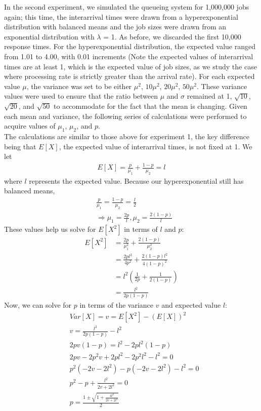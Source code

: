 \documentclass[12pt]{article}
\begin{document}
In the second experiment, we simulated the queueing system for 1,000,000 jobs again; this time, the interarrival times were drawn from a hyperexponential distribution with balanced means and the job sizes were drawn from an exponential distribution with $\lambda$ = 1. As before, we discarded the first 10,000 response times. For the hyperexponential distribution, the expected value ranged from 1.01 to 4.00, with 0.01 increments (Note the expected values of interarrival times are at least 1, which is the expected value of job sizes, as we study the case where processing rate is strictly greater than the arrival rate). For each expected value $\mu$, the variance was set to be either $\mu^2$, $10\mu^2$, $20\mu^2$, $50\mu^2$. These variance values were used to ensure that the ratio between $\mu$ and $\sigma$ remained at 1, $\sqrt{10}$, $\sqrt{20}$, and $\sqrt{50}$ to accommodate for the fact that the mean is changing. Given each mean and variance, the following series of calculations were performed to acquire values of $\mu_1$, $\mu_2$, and $p$. \\

The calculations are similar to those above for experiment 1, the key difference being that $E[X]$, the expected value of interarrival times, is not fixed at 1. We let
\begin{align*}
E[X] = \frac{p}{\mu_1} + \frac{1-p}{\mu_2} = l
\end{align*}
where $l$ represents the expected value. Because our hyperexponential still has balanced means, 
\begin{align*}
&\frac{p}{\mu_1} = \frac{1-p}{\mu_2} = \frac{l}{2} \\
&\Rightarrow \mu_1 = \frac{2p}{l}, \mu_2 = \frac{2(1-p)}{l}
\end{align*}
These values help us solve for $E[X^2]$ in terms of $l$ and $p$: 
\begin{align*}
E[X^2] &= \frac{2p}{\mu_1^2} + \frac{2(1-p)}{\mu_2^2} \\
&= \frac{2pl^2}{4p^2} + \frac{2(1-p)l^2}{4(1-p)^2} \\ 
&= l^2(\frac{1}{2p} + \frac{1}{2(1-p)}) \\
&= \frac{l^2}{2p(1-p)}
\end{align*}
Now, we can solve for $p$ in terms of the variance $v$ and expected value $l$: 
\begin{align*}
&Var[X] = v = E[X^2] - (E[X])^2 \\
&v = \frac{l^2}{2p(1-p)} - l^2 \\
&2pv(1-p) = l^2 - 2pl^2(1-p) \\ 
&2pv - 2p^2v + 2pl^2 - 2p^2l^2 - l^2 = 0 \\ 
&p^2(-2v - 2l^2) - p(-2v - 2l^2) - l^2 = 0 \\ 
&p^2 - p + \frac{l^2}{2v + 2l^2} = 0 \\ 
&p = \frac{1 \pm \sqrt{1 + \frac{4l^2}{2v + 2l^2}}}{2}
\end{align*}
\end{document}
